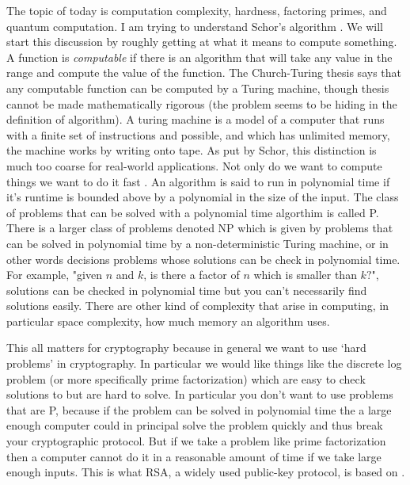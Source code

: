 \documentclass{amsart}
\theoremstyle{definition}
\begin{document}
The topic of today is computation complexity, hardness, factoring primes, and quantum computation. I am trying to understand Schor's algorithm \cite{Schor}. We will start this discussion by roughly getting at what it means to compute something. A function is \textit{computable} if there is an algorithm that will take any value in the range and compute the value of the function. The Church-Turing thesis says that any computable function can be computed by a Turing machine, though thesis cannot be made mathematically rigorous (the problem seems to be hiding in the definition of algorithm). A turing machine is a model of a computer that runs with a finite set of instructions and possible, and which has unlimited memory, the machine works by writing onto tape. As put by Schor, this distinction is much too coarse for real-world applications. Not only do we want to compute things we want to do it fast \cite{Schor}. An algorithm is said to run in polynomial time if it's runtime is bounded above by a polynomial in the size of the input. The class of problems that can be solved with a polynomial time algorthim is called P. There is a larger class of problems denoted NP which is given by problems that can be solved in polynomial time by a non-deterministic Turing machine, or in other words decisions problems whose solutions can be check in polynomial time. For example, "given $n$ and $k$, is there a factor of $n$ which is smaller than $k?$", solutions can be checked in polynomial time but you can't necessarily find solutions easily. There are other kind of complexity that arise in computing, in particular space complexity, how much memory an algorithm uses. 

This all matters for cryptography because in general we want to use `hard problems' in cryptography. In particular we would like things like the discrete log problem (or more specifically prime factorization) which are easy to check solutions to but are hard to solve. In particular you don't want to use problems that are P, because if the problem can be solved in polynomial time the a large enough computer could in principal solve the problem quickly and thus break your cryptographic protocol. But if we take a problem like prime factorization then a computer cannot do it in a reasonable amount of time if we take large enough inputs. This is what RSA, a widely used public-key protocol, is based on \cite{RSA}.
\end{document}
